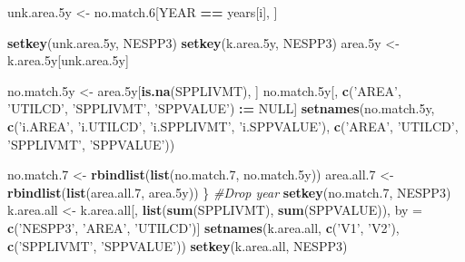\documentclass[]{article}
\newenvironment{Shaded}{\begin{snugshade}}{\end{snugshade}}
\newcommand{\KeywordTok}[1]{\textcolor[rgb]{0.13,0.29,0.53}{\textbf{#1}}}
\newcommand{\DecValTok}[1]{\textcolor[rgb]{0.00,0.00,0.81}{#1}}
\newcommand{\StringTok}[1]{\textcolor[rgb]{0.31,0.60,0.02}{#1}}
\newcommand{\CommentTok}[1]{\textcolor[rgb]{0.56,0.35,0.01}{\textit{#1}}}
\newcommand{\OtherTok}[1]{\textcolor[rgb]{0.56,0.35,0.01}{#1}}
\newcommand{\OperatorTok}[1]{\textcolor[rgb]{0.81,0.36,0.00}{\textbf{#1}}}
\newcommand{\ErrorTok}[1]{\textcolor[rgb]{0.64,0.00,0.00}{\textbf{#1}}}
\newcommand{\NormalTok}[1]{#1}
\begin{document}
\begin{Shaded}
\begin{Highlighting}[]
{{\NormalTok{    unk.area.5y <-}\StringTok{ }\NormalTok{no.match.}\DecValTok{6}\NormalTok{[YEAR }\OperatorTok{==}\StringTok{ }\NormalTok{years[i], ]}
    
    \KeywordTok{setkey}\NormalTok{(unk.area.5y, NESPP3)}
    \KeywordTok{setkey}\NormalTok{(k.area.5y,   NESPP3)}
\NormalTok{    area.5y <-}\StringTok{ }\NormalTok{k.area.5y[unk.area.5y] }
    
\NormalTok{    no.match.5y <-}\StringTok{ }\NormalTok{area.5y[}\KeywordTok{is.na}\NormalTok{(SPPLIVMT), ]}
\NormalTok{    no.match.5y[, }\KeywordTok{c}\NormalTok{(}\StringTok{'AREA'}\NormalTok{, }\StringTok{'UTILCD'}\NormalTok{, }\StringTok{'SPPLIVMT'}\NormalTok{, }\StringTok{'SPPVALUE'}\NormalTok{) }\OperatorTok{:}\ErrorTok{=}\StringTok{ }\OtherTok{NULL}\NormalTok{]}
    \KeywordTok{setnames}\NormalTok{(no.match.5y, }\KeywordTok{c}\NormalTok{(}\StringTok{'i.AREA'}\NormalTok{, }\StringTok{'i.UTILCD'}\NormalTok{, }\StringTok{'i.SPPLIVMT'}\NormalTok{, }\StringTok{'i.SPPVALUE'}\NormalTok{), }
             \KeywordTok{c}\NormalTok{(}\StringTok{'AREA'}\NormalTok{, }\StringTok{'UTILCD'}\NormalTok{, }\StringTok{'SPPLIVMT'}\NormalTok{, }\StringTok{'SPPVALUE'}\NormalTok{))}
    
\NormalTok{    no.match.}\DecValTok{7}\NormalTok{ <-}\StringTok{ }\KeywordTok{rbindlist}\NormalTok{(}\KeywordTok{list}\NormalTok{(no.match.}\DecValTok{7}\NormalTok{, no.match.5y))}
\NormalTok{    area.all.}\DecValTok{7}\NormalTok{ <-}\StringTok{ }\KeywordTok{rbindlist}\NormalTok{(}\KeywordTok{list}\NormalTok{(area.all.}\DecValTok{7}\NormalTok{, area.5y))}
\NormalTok{    \}   }
  \CommentTok{#Drop year}
  \KeywordTok{setkey}\NormalTok{(no.match.}\DecValTok{7}\NormalTok{, NESPP3)}
\NormalTok{  k.area.all <-}\StringTok{ }\NormalTok{k.area.all[, }\KeywordTok{list}\NormalTok{(}\KeywordTok{sum}\NormalTok{(SPPLIVMT), }\KeywordTok{sum}\NormalTok{(SPPVALUE)), }
\NormalTok{                           by =}\StringTok{ }\KeywordTok{c}\NormalTok{(}\StringTok{'NESPP3'}\NormalTok{, }\StringTok{'AREA'}\NormalTok{, }\StringTok{'UTILCD'}\NormalTok{)]}
  \KeywordTok{setnames}\NormalTok{(k.area.all, }\KeywordTok{c}\NormalTok{(}\StringTok{'V1'}\NormalTok{, }\StringTok{'V2'}\NormalTok{), }\KeywordTok{c}\NormalTok{(}\StringTok{'SPPLIVMT'}\NormalTok{, }\StringTok{'SPPVALUE'}\NormalTok{))}
  \KeywordTok{setkey}\NormalTok{(k.area.all, NESPP3)}
  
}}
\end{Highlighting}
\end{Shaded}
\end{document}
